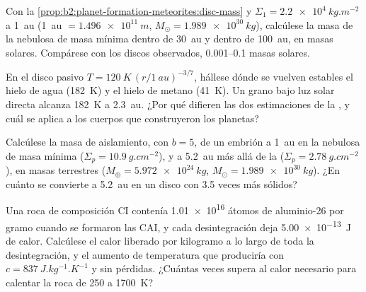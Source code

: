 \begin{exercise}[$\star\star$]\label{exo:b2:planet-formation-meteorites:5}
Con la \cref{prop:b2:planet-formation-meteorites:disc-mass} y
$\Sigma_1 = \qty{2.2e4}{kg.m^{-2}}$ a \qty{1}{au} (\qty{1}{au} $=
\qty{1.496e11}{m}$, $M_\odot = \qty{1.989e30}{kg}$), calcúlese la masa de la
nebulosa de masa mínima dentro de \qty{30}{au} y dentro de \qty{100}{au}, en masas
solares. Compárese con los discos observados, \numrange{0.001}{0.1} masas solares.
\end{exercise}

\begin{exercise}[$\star\star$]\label{exo:b2:planet-formation-meteorites:6}
En el disco pasivo $T = \qty{120}{K}\,(r/\qty{1}{au})^{-3/7}$, hállese dónde se vuelven estables el hielo
de agua (\qty{182}{K}) y el hielo de metano (\qty{41}{K}). Un grano bajo luz solar
directa alcanza \qty{182}{K} a \qty{2.3}{au}. ¿Por qué difieren las dos estimaciones de la
, y cuál se aplica a los cuerpos que construyeron los planetas?
\end{exercise}

\begin{exercise}[$\star\star$]\label{exo:b2:planet-formation-meteorites:7}
Calcúlese la masa de aislamiento, con $b = 5$, de un embrión a \qty{1}{au} en la
nebulosa de masa mínima ($\Sigma_p = \qty{10.9}{g.cm^{-2}}$), y a \qty{5.2}{au}
más allá de la  ($\Sigma_p = \qty{2.78}{g.cm^{-2}}$), en masas terrestres
($M_\oplus = \qty{5.972e24}{kg}$, $M_\odot = \qty{1.989e30}{kg}$). ¿En cuánto se
convierte a \qty{5.2}{au} en un disco con \num{3.5} veces más sólidos?
\end{exercise}

\begin{exercise}[$\star\star$]\label{exo:b2:planet-formation-meteorites:8}
Una roca de composición CI contenía \num{1.01e16} átomos de aluminio-26 por gramo cuando
se formaron las CAI, y cada desintegración deja \qty{5.00e-13}{J} de calor. Calcúlese el
calor liberado por kilogramo a lo largo de toda la desintegración, y el aumento de temperatura que
produciría con $c = \qty{837}{J.kg^{-1}.K^{-1}}$ y sin pérdidas. ¿Cuántas veces
supera al calor necesario para calentar la roca de \num{250} a
\qty{1700}{K}?
\end{exercise}

